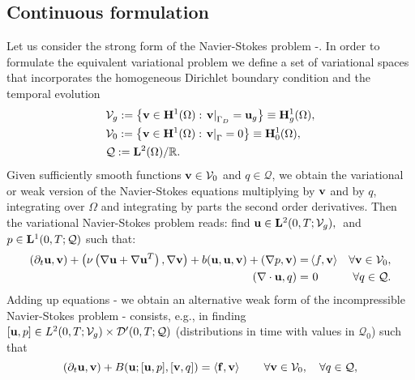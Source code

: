 \subsection{Continuous formulation}
\label{subsec-variational_continuous}
Let us consider the strong form of the Navier-Stokes problem -. In order to formulate the equivalent variational problem we define a set of variational spaces that incorporates the homogeneous Dirichlet boundary condition and the temporal evolution
\begin{align}
\label{eq-C2_varia_NS_u_space}
&\mathcal{V}_g:=\left\{{\bf v}\in{\bf H}^1(\Omega):\left.{\bf v}\right|_{\Gamma_D}={\bf u}_g\right\}\equiv{\bf H}^1_g(\Omega),\\
\label{eq-C2_varia_NS_v_space}
&\mathcal{V}_0:=\left\{{\bf v}\in{\bf H}^1(\Omega):\left.{\bf v}\right|_\Gamma=0\right\}\equiv{\bf H}^1_0(\Omega),\\
\label{eq-C2_varia_NS_p_space}
&\mathcal{Q}:={\bf L}^2(\Omega)/\mathbb{R}.
\end{align}
Given sufficiently smooth functions $ {\bf v}\in\mathcal{V}_0 $ and $ q\in\mathcal{Q} $, we obtain the variational or weak version of the Navier-Stokes equations multiplying  by $ {\bf v} $  and  by $ q $, integrating over $ \Omega $ and integrating by parts the second order derivatives. Then the variational Navier-Stokes problem reads: find $ {\bf u}\in{\bf L}^2(0,T;\mathcal{V}_g),\\ $ and $ p\in{\bf L}^1(0,T;\mathcal{Q}) $ such that: 
\begin{align}
\label{eq-C2_varia_NS_weak_momentum}
(\partial_t{\bf u},{\bf v})+\left(\nu\left(\nabla{\bf u}+\nabla{\bf u}^T\right),\nabla{\bf v}\right)+b({\bf u},{\bf u},{\bf v})+(\nabla p,{\bf v})=&\left\langle f,{\bf v}\right\rangle&\forall{\bf v}\in\mathcal{V}_0,\\
\label{eq-C2_varia_NS_weak_continuity}
(\nabla\cdot{\bf u},q)=&\ 0&\forall q\in\mathcal{Q}.
\end{align}
Adding up equations - we obtain an alternative weak form of the incompressible Navier-Stokes problem - consists, e.g., in finding $[{\bf u},p]\in {L}^2(0,T;\mathcal{V}_g)\times {\cal D}'(0,T;\mathcal{Q})$ (distributions in time with values in $\mathcal{Q}_0$) such that
\begin{equation}
\label{eq-C2_NS_weak}
(\partial_t{\bf u},{\bf v}) + B({\bf u};[{\bf u},p],[{\bf v},q]) = \left<{\bf f},{\bf v}\right> 
\quad\quad\forall{\bf v}\in\mathcal{V}_0,\quad\forall q\in\mathcal{Q},
\end{equation}
